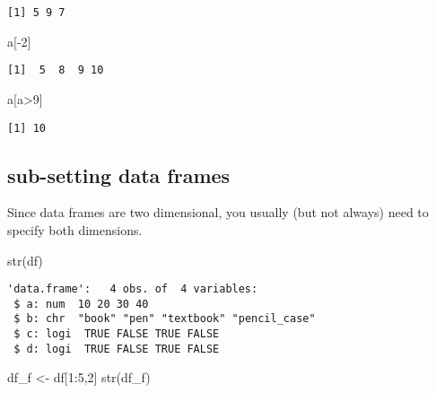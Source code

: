 \documentclass[
  letterpaper,
  DIV=11,
  numbers=noendperiod]{scrreprt}
\newenvironment{Shaded}{\begin{snugshade}}{\end{snugshade}}
\newcommand{\DecValTok}[1]{\textcolor[rgb]{0.68,0.00,0.00}{#1}}
\newcommand{\FunctionTok}[1]{\textcolor[rgb]{0.28,0.35,0.67}{#1}}
\newcommand{\NormalTok}[1]{\textcolor[rgb]{0.00,0.23,0.31}{#1}}
\newcommand{\OtherTok}[1]{\textcolor[rgb]{0.00,0.23,0.31}{#1}}
\newcommand{\SpecialCharTok}[1]{\textcolor[rgb]{0.37,0.37,0.37}{#1}}
\begin{document}
\begin{verbatim}
[1] 5 9 7
\end{verbatim}

\begin{Shaded}
\begin{Highlighting}[]
\NormalTok{a[}\SpecialCharTok{{-}}\DecValTok{2}\NormalTok{]}
\end{Highlighting}
\end{Shaded}

\begin{verbatim}
[1]  5  8  9 10
\end{verbatim}

\begin{Shaded}
\begin{Highlighting}[]
\NormalTok{a[a}\SpecialCharTok{\textgreater{}}\DecValTok{9}\NormalTok{]}
\end{Highlighting}
\end{Shaded}

\begin{verbatim}
[1] 10
\end{verbatim}

\subsection{sub-setting data frames}\label{sub-setting-data-frames}

Since data frames are two dimensional, you usually (but not always) need
to specify both dimensions.

\begin{Shaded}
\begin{Highlighting}[]
\FunctionTok{str}\NormalTok{(df)}
\end{Highlighting}
\end{Shaded}

\begin{verbatim}
'data.frame':   4 obs. of  4 variables:
 $ a: num  10 20 30 40
 $ b: chr  "book" "pen" "textbook" "pencil_case"
 $ c: logi  TRUE FALSE TRUE FALSE
 $ d: logi  TRUE FALSE TRUE FALSE
\end{verbatim}

\begin{Shaded}
\begin{Highlighting}[]
\NormalTok{df\_f }\OtherTok{\textless{}{-}}\NormalTok{ df[}\DecValTok{1}\SpecialCharTok{:}\DecValTok{5}\NormalTok{,}\DecValTok{2}\NormalTok{]}
\FunctionTok{str}\NormalTok{(df\_f)}
\end{Highlighting}
\end{Shaded}
\end{document}
